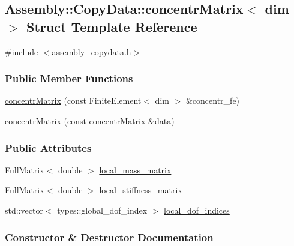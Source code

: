 \hypertarget{struct_assembly_1_1_copy_data_1_1concentr_matrix}{}\subsection{Assembly\+:\+:Copy\+Data\+:\+:concentr\+Matrix$<$ dim $>$ Struct Template Reference}
\label{struct_assembly_1_1_copy_data_1_1concentr_matrix}


{\ttfamily \#include $<$assembly\+\_\+copydata.\+h$>$}

\subsubsection*{Public Member Functions}
\begin{DoxyCompactItemize}
\item 
\hyperlink{struct_assembly_1_1_copy_data_1_1concentr_matrix_a3a79ebd7ee4093e8e06ee9ef0757596a}{concentr\+Matrix} (const Finite\+Element$<$ dim $>$ \&concentr\+\_\+fe)
\item 
\hyperlink{struct_assembly_1_1_copy_data_1_1concentr_matrix_a556e73863e274fc87366b661c0b8c2cb}{concentr\+Matrix} (const \hyperlink{struct_assembly_1_1_copy_data_1_1concentr_matrix}{concentr\+Matrix} \&data)
\end{DoxyCompactItemize}
\subsubsection*{Public Attributes}
\begin{DoxyCompactItemize}
\item 
Full\+Matrix$<$ double $>$ \hyperlink{struct_assembly_1_1_copy_data_1_1concentr_matrix_ac9d3fa147044cb330edcbfb28c9a51d8}{local\+\_\+mass\+\_\+matrix}
\item 
Full\+Matrix$<$ double $>$ \hyperlink{struct_assembly_1_1_copy_data_1_1concentr_matrix_ae611593ae75fc8317c368c54443a63f8}{local\+\_\+stiffness\+\_\+matrix}
\item 
std\+::vector$<$ types\+::global\+\_\+dof\+\_\+index $>$ \hyperlink{struct_assembly_1_1_copy_data_1_1concentr_matrix_a0388e1a38666197f44bfe6c39d95f6c6}{local\+\_\+dof\+\_\+indices}
\end{DoxyCompactItemize}


\subsubsection{Constructor \& Destructor Documentation}
\hypertarget{struct_assembly_1_1_copy_data_1_1concentr_matrix_a3a79ebd7ee4093e8e06ee9ef0757596a}{}
